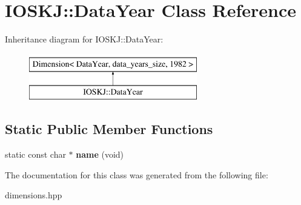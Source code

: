 \hypertarget{classIOSKJ_1_1DataYear}{\section{I\-O\-S\-K\-J\-:\-:Data\-Year Class Reference}
\label{classIOSKJ_1_1DataYear}
}
Inheritance diagram for I\-O\-S\-K\-J\-:\-:Data\-Year\-:\begin{figure}[H]
\begin{center}
\leavevmode
\includegraphics[height=2.000000cm]{classIOSKJ_1_1DataYear}
\end{center}
\end{figure}
\subsection*{Static Public Member Functions}
\begin{DoxyCompactItemize}
\item 
\hypertarget{classIOSKJ_1_1DataYear_ad010dabb07a1be03f32d062deb360963}{static const char $\ast$ {\bfseries name} (void)}\label{classIOSKJ_1_1DataYear_ad010dabb07a1be03f32d062deb360963}

\end{DoxyCompactItemize}


The documentation for this class was generated from the following file\-:\begin{DoxyCompactItemize}
\item 
dimensions.\-hpp\end{DoxyCompactItemize}
